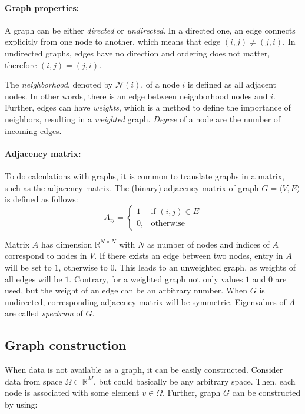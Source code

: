 \paragraph{Graph properties:}
A graph can be either \textit{directed} or \textit{undirected}. 
In a directed one, an edge connects explicitly from one node to another, which means that edge $(i, j) \neq (j, i)$. 
In undirected graphs, edges have no direction and ordering does not matter, therefore $(i, j) = (j, i)$.

The \textit{neighborhood}, denoted by $\mathcal{N}(i)$, of a node $i$  is defined as all adjacent nodes.
In other words, there is an edge between neighborhood nodes and $i$. 
Further, edges can have \textit{weights}, which is a method to define the importance of neighbors, resulting in a \textit{weighted} graph.
\textit{Degree} of a node are the number of incoming edges.

\paragraph{Adjacency matrix:}
To do calculations with graphs, it is common to translate graphs in a matrix, 
such as the adjacency matrix.
The (binary) adjacency matrix of graph $G = \langle V, E \rangle$ is defined as follows:
\begin{equation}
    \label{eg:AdjacencyMatrix}
    A_{ij} =    
    \begin{cases}
        1  & \text{if } (i, j) \in E \\
        0, & \text{otherwise}
    \end{cases}
\end{equation}

Matrix $A$ has dimension $\mathbb{R}^{N \times N}$ with $N$ as number of nodes
and indices of $A$ correspond to nodes in $V$.
If there exists an edge between two nodes, entry in $A$ will be set to $1$, otherwise to $0$.
This leads to an unweighted graph, as weights of all edges will be $1$.
Contrary, for a weighted graph not only values $1$ and $0$ are used, but the weight of an edge
can be an arbitrary number.
When $G$ is undirected, corresponding adjacency matrix will be symmetric. 
Eigenvalues of $A$ are called \textit{spectrum} of $G$.


\subsection{Graph construction}
\label{sec:graphConstruction}
When data is not available as a graph, it can be easily constructed.
Consider data from space $\Omega \subset \mathbb{R}^M $, but could basically be any arbitrary space.
Then, each node is associated with some element $v \in \Omega$. 
Further, graph $G$ can be constructed by using:

